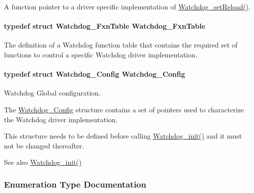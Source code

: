 A function pointer to a driver specific implementation of \hyperlink{_watchdog_8h_a77ec81e1304fe05b77a9976e10e2d9a3}{Watchdog\+\_\+set\+Reload()}. 

\paragraph[{Watchdog\+\_\+\+Fxn\+Table}]{\setlength{\rightskip}{0pt plus 5cm}typedef struct {\bf Watchdog\+\_\+\+Fxn\+Table}  {\bf Watchdog\+\_\+\+Fxn\+Table}}\label{_watchdog_8h_ad3e804ec79af5e10e8ef3af301860ef5}


The definition of a Watchdog function table that contains the required set of functions to control a specific Watchdog driver implementation. 

\paragraph[{Watchdog\+\_\+\+Config}]{\setlength{\rightskip}{0pt plus 5cm}typedef struct {\bf Watchdog\+\_\+\+Config}  {\bf Watchdog\+\_\+\+Config}}\label{_watchdog_8h_ad8c9eb8a1cd2934965d385293fc38647}


Watchdog Global configuration. 

The \hyperlink{struct_watchdog___config}{Watchdog\+\_\+\+Config} structure contains a set of pointers used to characterize the Watchdog driver implementation.

This structure needs to be defined before calling \hyperlink{_watchdog_8h_afaadfb59be17661ae95562f2081355e7}{Watchdog\+\_\+init()} and it must not be changed thereafter.

\begin{DoxySeeAlso}{See also}
\hyperlink{_watchdog_8h_afaadfb59be17661ae95562f2081355e7}{Watchdog\+\_\+init()} 
\end{DoxySeeAlso}


\subsubsection{Enumeration Type Documentation}
